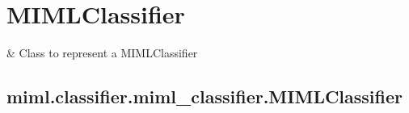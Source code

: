 \documentclass[letterpaper,10pt,english]{sphinxmanual}
\begin{document}
\sphinxstepscope


\section{MIMLClassifier}
\label{\detokenize{classifier/miml_classifier:mimlclassifier}}\label{\detokenize{classifier/miml_classifier::doc}}

\begin{savenotes}\sphinxattablestart
\sphinxthistablewithglobalstyle
\sphinxthistablewithnovlinesstyle
\centering
\begin{tabulary}{\linewidth}[t]{}
\sphinxtoprule
\sphinxtableatstartofbodyhook
\sphinxAtStartPar
{\hyperref[\detokenize{classifier/_autosummary/miml.classifier.miml_classifier.MIMLClassifier:miml.classifier.miml_classifier.MIMLClassifier}]{}}
&
\sphinxAtStartPar
Class to represent a MIMLClassifier
\\
\sphinxbottomrule
\end{tabulary}
\sphinxtableafterendhook\par
\sphinxattableend\end{savenotes}

\sphinxstepscope


\subsection{miml.classifier.miml\_classifier.MIMLClassifier}
\label{\detokenize{classifier/_autosummary/miml.classifier.miml_classifier.MIMLClassifier:miml-classifier-miml-classifier-mimlclassifier}}\label{\detokenize{classifier/_autosummary/miml.classifier.miml_classifier.MIMLClassifier::doc}}
\end{document}
